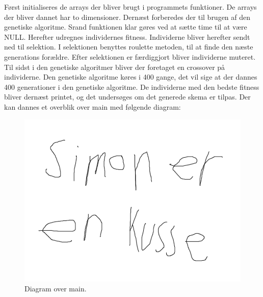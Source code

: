 Først initialiseres de arrays der bliver brugt i programmets funktioner. De arrays der bliver dannet har to dimensioner.
Dernæst forberedes der til brugen af den genetiske algoritme. Srand funktionen klar gøres ved at sætte time til at være NULL. Herefter udregnes individernes fitness. Individerne bliver herefter sendt ned til selektion. I selektionen benyttes roulette metoden, til at finde den næste generations forældre. Efter selektionen er færdiggjort bliver individerne muteret. Til sidst i den genetiske algoritmer bliver der foretaget en crossover på individerne. Den genetiske algoritme køres i 400 gange, det vil sige at der dannes 400 generationer i den genetiske algoritme.  De individerne med den bedste fitness bliver dernæst printet, og det undersøges om det generede skema er tilpas. Der kan dannes et overblik over main med følgende diagram:
\begin{figure}[!h]
  \centering
  \includegraphics[width=\textwidth]{partials/graphics/main.png}
  \caption{Diagram over main.}
  \label{fig:main}
\end{figure}
